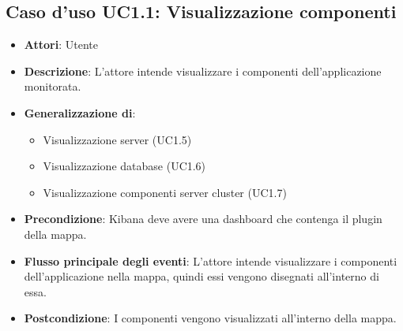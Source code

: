  \hypertarget{UC1.1}{}
\subsection{Caso d'uso UC1.1: Visualizzazione componenti}
\begin{itemize}
	\item \textbf{Attori}: Utente
	\item \textbf{Descrizione}: L'attore intende visualizzare i componenti dell'applicazione monitorata.
	\item 	\textbf{Generalizzazione di}:
	\begin{itemize}
		\item Visualizzazione server (UC1.5)
		\item Visualizzazione database (UC1.6)
		\item Visualizzazione componenti server cluster (UC1.7)
	\end{itemize}
	\item \textbf{Precondizione}: Kibana deve avere una dashboard che contenga il plugin della mappa.
	\item \textbf{Flusso principale degli eventi}: L'attore intende visualizzare i componenti dell'applicazione nella mappa, quindi essi vengono disegnati all'interno di essa.
	\item \textbf{Postcondizione}: I componenti vengono visualizzati all'interno della mappa.
\end{itemize}

